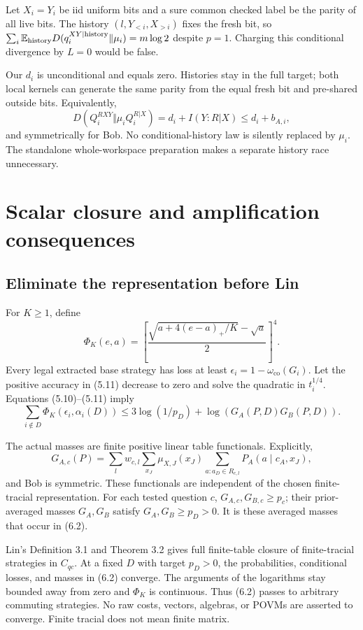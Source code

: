 \documentclass[11pt,reqno]{amsart}
\numberwithin{equation}{section}
\begin{document}
Let \(X_i=Y_i\) be iid uniform bits and a sure common checked label be the parity of all live bits. The history \((l,Y_{<i},X_{>i})\) fixes the fresh bit, so \(\sum_i\mathbb E_{\rm history}D(q_i^{XY|\rm history}\Vert\mu_i)=m\log2\) despite \(p=1\). Charging this conditional divergence by \(L=0\) would be false.

Our \(d_i\) is unconditional and equals zero. Histories stay in the full target; both local kernels can generate the same parity from the equal fresh bit and pre-shared outside bits. Equivalently, \[
 D(Q_i^{RXY}\Vert\mu_i Q_i^{R|X})
 =d_i+I(Y:R|X)\le d_i+b_{A,i},
\] and symmetrically for Bob. No conditional-history law is silently replaced by \(\mu_i\). The standalone whole-workspace preparation makes a separate history race unnecessary.

\section{Scalar closure and amplification consequences}\label{scalar-closure-and-amplification-consequences}

\subsection{Eliminate the representation before Lin}\label{eliminate-the-representation-before-lin}

For \(K\ge1\), define \[
 \Phi_K(e,a)=
 \left[\frac{\sqrt{a+4(e-a)_+/K}-\sqrt a}{2}\right]^4. \tag{6.1}
\] Every legal extracted base strategy has loss at least \(\epsilon_i=1-\omega_{\mathrm{co}}(G_i)\). Let the positive accuracy in (5.11) decrease to zero and solve the quadratic in \(t_i^{1/4}\). Equations (5.10)--(5.11) imply \[
 \sum_{i\notin D}\Phi_K(\epsilon_i,\alpha_i(D))
 \le3\log(1/p_D)+\log(G_A(P,D)G_B(P,D)). \tag{6.2}
\]

The actual masses are finite positive linear table functionals. Explicitly, \[
 G_{A,c}(P)=\sum_lw_{c,l}
 \sum_{x_J}\mu_{X,J}(x_J)
 \sum_{a:a_D\in R_{c,l}}P_A(a\mid c_A,x_J), \tag{6.3}
\] and Bob is symmetric. These functionals are independent of the chosen finite-tracial representation. For each tested question \(c\), \(G_{A,c},G_{B,c}\ge p_c\); their prior-averaged masses \(G_A,G_B\) satisfy \(G_A,G_B\ge p_D>0\). It is these averaged masses that occur in (6.2).

Lin's Definition 3.1 and Theorem 3.2 \cite{LinTr} gives full finite-table closure of finite-tracial strategies in \(C_{qc}\). At a fixed \(D\) with target \(p_D>0\), the probabilities, conditional losses, and masses in (6.2) converge. The arguments of the logarithms stay bounded away from zero and \(\Phi_K\) is continuous. Thus (6.2) passes to arbitrary commuting strategies. No raw costs, vectors, algebras, or POVMs are asserted to converge. Finite tracial does not mean finite matrix.
\end{document}
